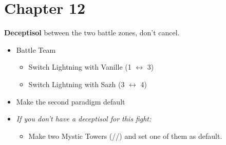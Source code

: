 \chapter{Chapter 12}

	{  }
	{ 
	  {
	}
}


\textbf{Deceptisol} between the two battle zones, don't cancel.

\begin{menu}
	\begin{itemize}
		\paradigm
		\begin{itemize}
			\item Battle Team
			      \begin{itemize}
				      \item Switch Lightning with Vanille (1 $\leftrightarrow$ 3)
				      \item Switch Lightning with Sazh (3 $\leftrightarrow$ 4)
			      \end{itemize}
			\item Make the second paradigm default
			\item \textit{If you don't have a deceptisol for this fight:}
				\begin{itemize}
					\item Make two Mystic Towers (\rav/\sen/\rav) and set one of them as default.
				\end{itemize}
		\end{itemize}
	\end{itemize}
\end{menu}

\renewcommand{\second}{[2] Relentless Assault (\rav/\rav/\com)}

